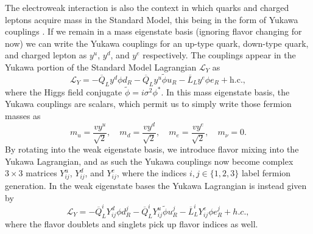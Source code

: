 The electroweak interaction is also the context in which quarks and charged leptons acquire mass in the Standard Model, this being in the form of Yukawa couplings \cite{PhysRevLett.19.1264, 10.1143/PTPS.1.1}.  If we remain in a mass eigenstate basis (ignoring flavor changing for now) we can write the Yukawa couplings for an up-type quark, down-type quark, and charged lepton as $y^u$, $y^d$, and $y^e$ respectively.  The couplings appear in the Yukawa portion of the Standard Model Lagrangian $\mathcal{L}_Y$ as
\begin{equation}
    \mathcal{L}_{Y} = −\overline{Q}_Ly^d\phi d_R- 
    \overline{Q}_Ly^u\tilde{\phi}u_R-
    \overline{L}_Ly^e\phi e_R+\mathrm{h.c.},
\end{equation}
where the Higgs field conjugate $\tilde{\phi} = i\sigma^2\phi^*$. In this mass eigenstate basis, the Yukawa couplings are scalars, which permit us to simply write those fermion masses as 
\begin{equation}
    m_u = \frac{vy^u}{\sqrt{2}}, \quad m_d = \frac{vy^d}{\sqrt{2}}, \quad m_e = \frac{vy^e}{\sqrt{2}}, \quad m_\nu = 0.
\end{equation}
By rotating into the weak eigenstate basis, we introduce flavor mixing into the Yukawa Lagrangian, and as such the Yukawa couplings now become complex $3\times3$ matrices $Y^u_{ij}$, $Y^d_{ij}$, and $Y^e_{ij}$, where the indices $i,j \in \{1,2,3\}$ label fermion generation.  In the weak eigenstate bases the Yukawa Lagrangian is instead given by
\begin{equation}
    \mathcal{L}_{Y} = −\overline{Q}_L^iY^d_{ij}\phi d_R^j- 
    \overline{Q}_L^iY^u_{ij}\tilde{\phi}u_R^j-
    \overline{L}_L^iY^e_{ij}\phi e_R^j+h.c.,
\end{equation}
where the flavor doublets and singlets pick up flavor indices as well.










